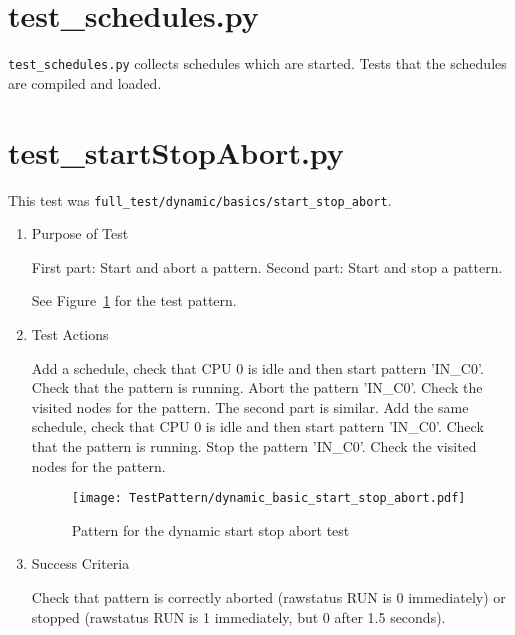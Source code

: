 \documentclass[12pt,a4paper]{report}
\begin{document}
\section{test\_schedules.py}
\texttt{test\_schedules.py} collects schedules which are started. Tests that the schedules are compiled and loaded.



\section{test\_startStopAbort.py}
This test was \texttt{full\_test/dynamic/basics/start\_stop\_abort}.
\begin{enumerate}
  \item Purpose of Test

    First part: Start and abort a pattern. Second part: Start and stop a pattern.

  See Figure~\ref{fig:Pattern_for_the_dynamic_start_stop_abort_test} for the test pattern.
  \item Test Actions

    Add a schedule, check that CPU 0 is idle and then start pattern 'IN\_C0'. Check that the pattern is running.
    Abort the pattern 'IN\_C0'. Check the visited nodes for the pattern. The second part is similar.
    Add the same schedule, check that CPU 0 is idle and then start pattern 'IN\_C0'. Check that the pattern is running.
    Stop the pattern 'IN\_C0'. Check the visited nodes for the pattern.
    \begin{figure}
        \centering
        \texttt{[image: TestPattern/dynamic\_basic\_start\_stop\_abort.pdf]}
        \caption{Pattern for the dynamic start stop abort test}
        \label{fig:Pattern_for_the_dynamic_start_stop_abort_test}
    \end{figure}
  \item Success Criteria

  Check that pattern is correctly aborted (rawstatus RUN is 0 immediately) or
  stopped (rawstatus RUN is 1 immediately, but 0 after 1.5 seconds).
\end{enumerate}
\end{document}
